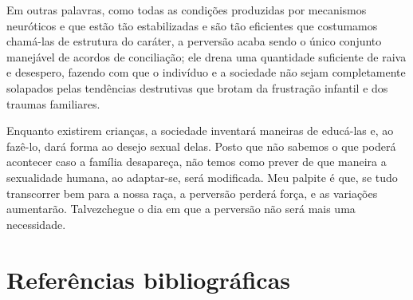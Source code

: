 Em outras palavras, como todas as condições produzidas por
mecanismos neuróticos e que estão tão estabilizadas e são tão
eficientes que costumamos chamá-las de estrutura do caráter, a
perversão acaba sendo o único conjunto manejável de acordos de
conciliação; ele drena uma quantidade suficiente de raiva e desespero,
fazendo com que o indivíduo e a sociedade não sejam completamente
solapados pelas tendências destrutivas que brotam da frustração
infantil e dos traumas familiares.

Enquanto existirem crianças, a sociedade inventará maneiras de
educá-las e, ao fazê-lo, dará forma ao desejo sexual delas. Posto que
não sabemos o que poderá acontecer caso a família desapareça, não temos
como prever de que maneira a sexualidade humana, ao adaptar-se, será
modificada. Meu palpite é que, se tudo transcorrer bem para a nossa
raça, a perversão perderá força, e as variações aumentarão. Talvez\idxpervneces[|)]
chegue o dia em que a perversão não será mais uma necessidade.



\chapter[Referências bibliográficas]{Referências bibliográficas}


